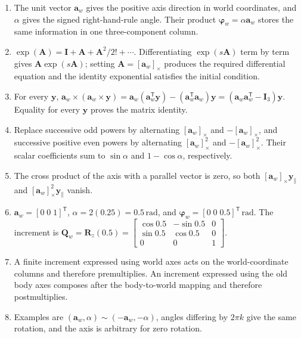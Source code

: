 \documentclass[
  australian,
  12pt,
  letterpaper,
  DIV=11,
  numbers=noendperiod,
  twoside]{scrreprt}
\providecommand{\tightlist}{%
  \setlength{\itemsep}{0pt}\setlength{\parskip}{0pt}}
\begin{document}
\begin{enumerate}
\def\labelenumi{\arabic{enumi}.}
\tightlist
\item
  The unit vector \(\mathbf a_w\) gives the positive axis direction in
  world coordinates, and \(\alpha\) gives the signed right-hand-rule
  angle. Their product \(\boldsymbol\varphi_w=\alpha\mathbf a_w\) stores
  the same information in one three-component column.
\item
  \(\exp(\mathbf A)=\mathbf I+\mathbf A+\mathbf A^2/2!+\cdots\).
  Differentiating \(\exp(s\mathbf A)\) term by term gives
  \(\mathbf A\exp(s\mathbf A)\); setting
  \(\mathbf A=[\mathbf a_w]_\times\) produces the required differential
  equation and the identity exponential satisfies the initial condition.
\item
  For every \(\mathbf y\),
  \(\mathbf a_w\times(\mathbf a_w\times\mathbf y)=\mathbf a_w(\mathbf a_w^\mathsf T\mathbf y)-(\mathbf a_w^\mathsf T\mathbf a_w)\mathbf y=(\mathbf a_w\mathbf a_w^\mathsf T-\mathbf I_3)\mathbf y\).
  Equality for every \(\mathbf y\) proves the matrix identity.
\item
  Replace successive odd powers by alternating \([\mathbf a_w]_\times\)
  and \(-[\mathbf a_w]_\times\), and successive positive even powers by
  alternating \([\mathbf a_w]_\times^2\) and
  \(-[\mathbf a_w]_\times^2\). Their scalar coefficients sum to
  \(\sin\alpha\) and \(1-\cos\alpha\), respectively.
\item
  The cross product of the axis with a parallel vector is zero, so both
  \([\mathbf a_w]_\times\mathbf y_{\parallel}\) and
  \([\mathbf a_w]_\times^2\mathbf y_{\parallel}\) vanish.
\item
  \(\mathbf a_w=[0\;0\;1]^\mathsf T\),
  \(\alpha=2(0.25)=0.5\,\mathrm{rad}\), and
  \(\boldsymbol\varphi_w=[0\;0\;0.5]^\mathsf T\,\mathrm{rad}\). The
  increment is
  \(\mathbf Q_w=\mathbf R_z(0.5)=\begin{bmatrix}\cos0.5&-\sin0.5&0\\\sin0.5&\cos0.5&0\\0&0&1\end{bmatrix}\).
\item
  A finite increment expressed using world axes acts on the
  world-coordinate columns and therefore premultiplies. An increment
  expressed using the old body axes composes after the body-to-world
  mapping and therefore postmultiplies.
\item
  Examples are \((\mathbf a_w,\alpha)\sim(-\mathbf a_w,-\alpha)\),
  angles differing by \(2\pi k\) give the same rotation, and the axis is
  arbitrary for zero rotation.
\end{enumerate}
\end{document}
